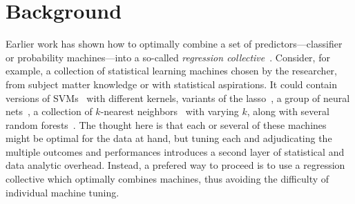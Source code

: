 \documentclass{bmcart}
\begin{document}
\begin{frontmatter}
\begin{abstractbox}
\begin{keyword}
\end{keyword}


\end{abstractbox}
%

\end{frontmatter}




\section*{Background}

Earlier work has shown how to optimally combine a set of
predictors---classifier or probability machines---into a so-called
{\it regression collective}~\cite{biau:2013}.  Consider, for example, a
collection of statistical learning machines chosen by the researcher,
from subject matter knowledge or with statistical aspirations. It
could contain versions of SVMs~\cite{vapnik:1998} with different
kernels, variants of the lasso~\cite{tibshirani:1996}, a group of
neural nets~\cite{ripley:1996}, a collection of $k$-nearest
neighbors~\cite{cover:hart:1967} with varying $k$, along with several
random forests~\cite{breiman:2001}. The thought here is that each or
several of these machines might be optimal for the data at hand, but
tuning each and adjudicating the multiple outcomes and performances
introduces a second layer of statistical and data analytic overhead.
Instead, a prefered way to proceed is to use a regression
collective which optimally combines machines, thus avoiding the
difficulty of individual machine tuning.
\end{document}
